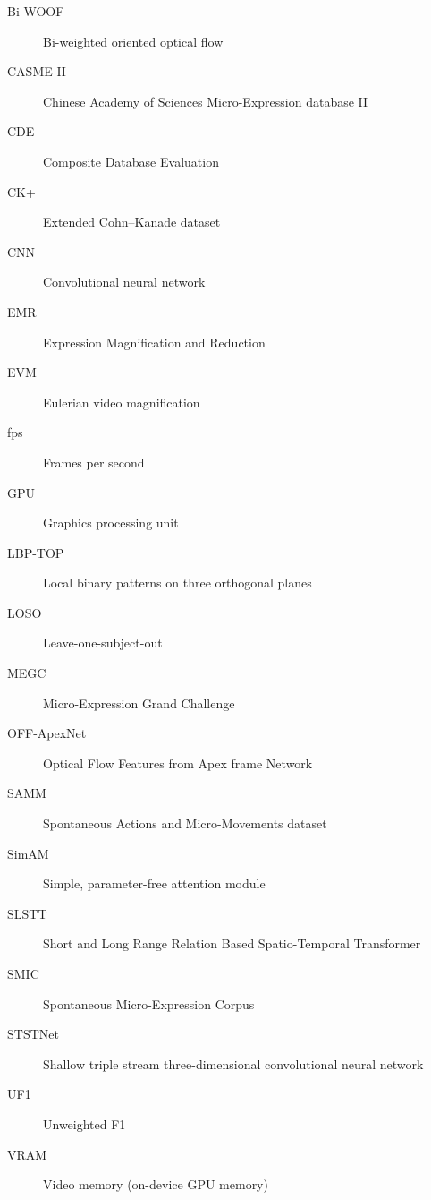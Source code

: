 \begin{description}
    \item[Bi-WOOF] Bi-weighted oriented optical flow
    \item[CASME II] Chinese Academy of Sciences Micro-Expression database II
    \item[CDE] Composite Database Evaluation
    \item[CK+] Extended Cohn--Kanade dataset
    \item[CNN] Convolutional neural network
    \item[EMR] Expression Magnification and Reduction
    \item[EVM] Eulerian video magnification
    \item[fps] Frames per second
    \item[GPU] Graphics processing unit
    \item[LBP-TOP] Local binary patterns on three orthogonal planes
    \item[LOSO] Leave-one-subject-out
    \item[MEGC] Micro-Expression Grand Challenge
    \item[OFF-ApexNet] Optical Flow Features from Apex frame Network
    \item[SAMM] Spontaneous Actions and Micro-Movements dataset
    \item[SimAM] Simple, parameter-free attention module
    \item[SLSTT] Short and Long Range Relation Based Spatio-Temporal Transformer
    \item[SMIC] Spontaneous Micro-Expression Corpus
    \item[STSTNet] Shallow triple stream three-dimensional convolutional neural network
    \item[UF1] Unweighted F1
    \item[VRAM] Video memory (on-device GPU memory)
\end{description}
